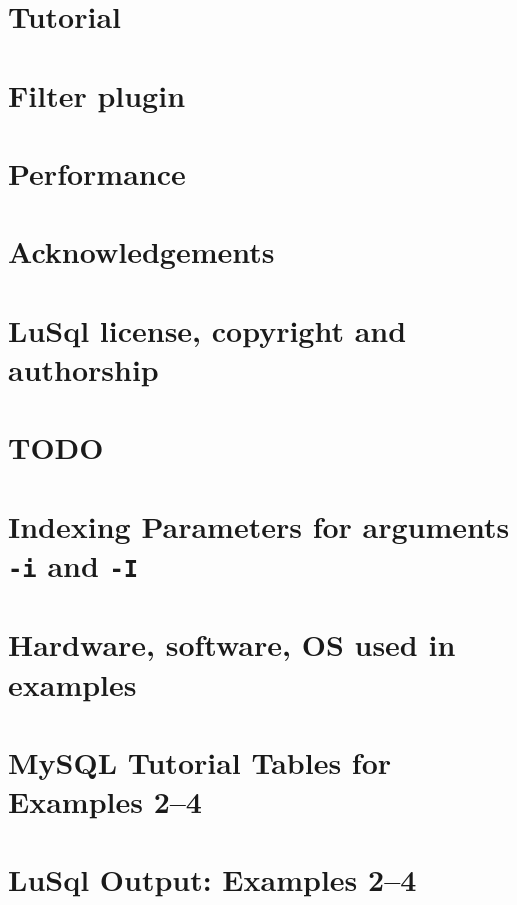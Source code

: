 \documentclass{article}[14pt]
\begin{document}
\section{Tutorial}


\section{Filter plugin}


\section{Performance}


\section{Acknowledgements}


\newpage
\appendix
\section{LuSql license, copyright and authorship}


\newpage
\section{TODO}


\newpage
\section{Indexing Parameters for arguments {\tt -i} and {\tt -I}}


\newpage
\section{Hardware, software, OS used in examples}


\newpage
\section{MySQL Tutorial Tables for Examples 2--4}


\newpage
\section{LuSql Output: Examples 2--4}

\end{document}
